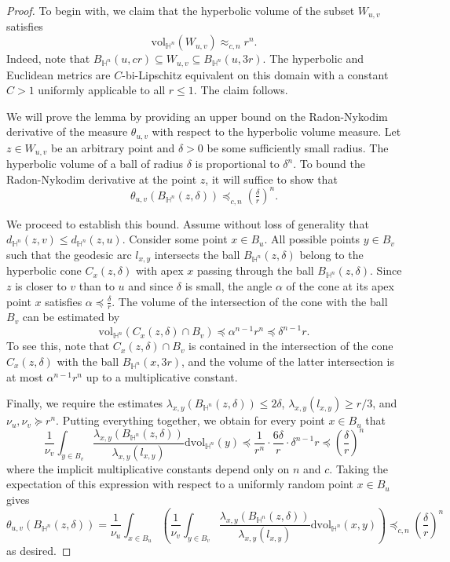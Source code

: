 \documentclass{amsart}
\newcommand{\HH}{\mathbb{H}}
\newcommand{\vol}{\mathrm{vol}}
\theoremstyle{plain}
\numberwithin{equation}{section}
\theoremstyle{definition}
\begin{document}
\begin{proof}
To begin with, we claim that the hyperbolic volume of the subset $W_{u,v}$ satisfies $$\vol_{\HH^n}(W_{u,v}) \approx_{c,n} r^n.$$ 
Indeed, note that
$B_{\HH^n}(u,cr)\subseteq W_{u,v}\subseteq B_{\HH^n}(u,3r)$. 
The hyperbolic and Euclidean metrics are $C$-bi-Lipschitz equivalent on this domain with a constant $C>1$ uniformly applicable to all $r \le 1$. The claim follows.

We will prove the lemma by providing an upper bound on the Radon-Nykodim derivative of the measure $\theta_{u,v}$ with respect to the hyperbolic volume measure. 
Let $z\in W_{u,v}$ be an arbitrary point and $\delta > 0$ be some sufficiently small radius. The hyperbolic volume of a ball of radius $\delta$ is proportional to $\delta^n$.  To bound the Radon-Nykodim derivative at the point $z$, it will suffice to show that
$$\theta_{u,v}(B_{\mathbb{H}^n}(z,\delta)) \preceq_{c,n}  \left(\tfrac{\delta}{r}\right)^n.$$

We proceed to establish this bound. Assume without loss of generality that $d_{\mathbb{H}^n}(z,v)\le d_{\mathbb{H}^n}(z,u)$.
Consider some point $x\in B_u$. 
All possible points $y\in B_v$ such that the geodesic arc $l_{x,y}$ intersects the ball $B_{\mathbb{H}^n}(z,\delta)$ belong to the hyperbolic cone $C_x(z,\delta)$ with apex $x$ passing through the ball $B_{\mathbb{H}^n}(z,\delta)$. 
Since $z$ is closer to $v$ than to $u$ and since $\delta$ is small, the angle $\alpha$ of the cone at its apex point $x$ satisfies $\alpha \preceq \frac{\delta}{r}$.
The volume of the intersection of the cone with the ball $B_v$ can be estimated by 
\begin{equation}\label{eq: vol of cone}
    \vol_{\HH^n}(C_x(z,\delta)\cap B_v)  \preceq  \alpha^{n-1}r^n \preceq  \delta^{n-1} r.
\end{equation}
To see this, note that $C_x(z,\delta)\cap B_v$ is contained in the intersection of the cone $C_x(z,\delta)$ with the ball $B_{\HH^n}(x,3r)$, and the volume of the latter intersection is at most $ \alpha^{n-1}r^n$ up to a multiplicative constant.

Finally, we require the estimates $\lambda_{x,y}(B_{\HH^n}(z,\delta))\le 2\delta$,  $\lambda_{x,y}(l_{x,y}) \ge r/3$, and  $\nu_u,\nu_v\succeq r^n$.
Putting everything together, we obtain for every point $x \in B_u$ that
$$ \frac {1}{\nu_v}\int_{ y\in B_v} \frac{\lambda_{x,y}( B_{\HH^n}(z,\delta))}{\lambda_{x,y}(l_{x,y})} \mathrm{dvol}_{\HH^n}(y) \preceq \frac{1}{r^n}\cdot \frac{6\delta}{r} \cdot  \delta^{n-1}r \preceq \left(\frac{\delta}{r}\right)^n $$
where the implicit multiplicative constants depend only on $n$ and $c$.
Taking the expectation of this expression with respect to a uniformly random point $x \in B_u$ gives 
$$ \theta_{u,v}(B_{\mathbb{H}^n}(z,\delta))=\frac {1}{\nu_u }\int_{x\in B_u} \left(\frac {1}{\nu_v}\int_{ y\in B_v} \frac{\lambda_{x,y}( B_{\mathbb{H}^n}(z,\delta))}{\lambda_{x,y}(l_{x,y})} \mathrm{dvol}_{\HH^n}(x,y) \right) \preceq_{c,n}  \left(\frac{\delta}{r}\right)^n $$
as desired.
\end{proof}
\end{document}
